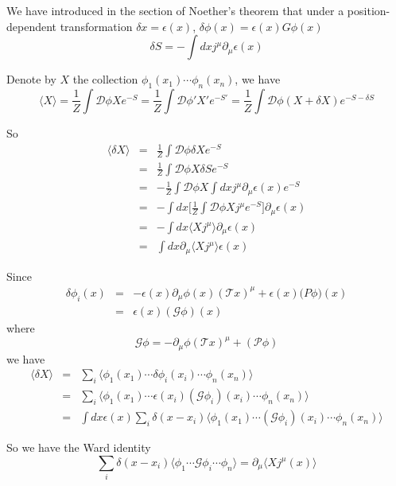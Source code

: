 \documentclass[12pt]{book}
\begin{document}
	We have introduced in the section of Noether's theorem that under a position-dependent transformation $\delta x=\epsilon(x)$, $\delta\phi(x)=\epsilon(x)G\phi(x)$
	\begin{equation}
		\delta S=-\int dx j^\mu\partial_\mu\epsilon(x)
	\end{equation}
	
	Denote by $X$ the collection $\phi_1(x_1)\cdots\phi_n(x_n)$, we have
	\begin{equation}
		\langle X\rangle=\frac 1Z\int\mathcal D \phi Xe^{-S}=\frac 1Z\int\mathcal D \phi' X'e^{-S'}=\frac 1Z\int\mathcal D \phi (X+\delta X)e^{-S-\delta S}
	\end{equation}
	
	So
	\begin{eqnarray}
		\langle \delta X\rangle&=&\frac 1Z\int\mathcal D \phi \delta Xe^{-S}\\
		&=&\frac 1Z\int\mathcal D \phi X\delta Se^{-S}\\
		&=&-\frac 1Z\int\mathcal D \phi X\int dx j^\mu\partial_\mu\epsilon(x)e^{-S}\\
		&=&-\int dx\Big[\frac 1Z\int\mathcal D \phi Xj^\mu e^{-S}\Big]\partial_\mu\epsilon(x)\\
		&=&-\int dx\langle Xj^\mu\rangle\partial_\mu\epsilon(x)\\
		&=&\int dx\partial_\mu\langle Xj^\mu\rangle\epsilon(x)
	\end{eqnarray}
	
	Since
	\begin{eqnarray}
		\delta\phi_i(x)&=&-\epsilon(x)\partial_\mu\phi(x)(\mathcal Tx)^\mu+\epsilon(x)\mathcal (P\phi)(x)\\
		&=&\epsilon(x) (\mathcal G\phi)(x)
	\end{eqnarray}
	where
	\begin{equation}
		\mathcal G\phi=-\partial_\mu\phi(\mathcal Tx)^\mu+(\mathcal P\phi)
	\end{equation}
	we have
	\begin{eqnarray}
		\langle \delta X\rangle&=&\sum_i\langle \phi_1(x_1)\cdots\delta\phi_i(x_i)\cdots\phi_n(x_n)\rangle\\
		&=&\sum_i\langle \phi_1(x_1)\cdots\epsilon(x_i) (\mathcal G\phi_i)(x_i)\cdots\phi_n(x_n)\rangle\\
		&=&\int dx \epsilon(x) \sum_i\delta(x-x_i)\langle \phi_1(x_1)\cdots (\mathcal G\phi_i)(x_i)\cdots\phi_n(x_n)\rangle
	\end{eqnarray}
		
	So we have the Ward identity
	\begin{equation}
		\sum_i\delta(x-x_i)\langle\phi_1\cdots\mathcal G\phi_i\cdots\phi_n\rangle=\partial_\mu\langle Xj^\mu(x)\rangle
	\end{equation}
	
\end{document}
